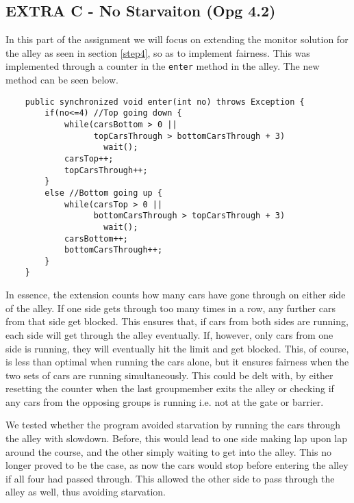 \subsection{EXTRA C - No Starvaiton (Opg 4.2)}
In this part of the assignment we will focus on extending the monitor solution for the alley as seen in section \ref{step4}, so as to implement fairness. This was implemented through a counter in the \texttt{enter} method in the alley. The new method can be seen below.

\begin{lstlisting}
    public synchronized void enter(int no) throws Exception {
        if(no<=4) //Top going down {   
            while(carsBottom > 0 || 
                  topCarsThrough > bottomCarsThrough + 3)
                    wait();
            carsTop++;
            topCarsThrough++;
        }
        else //Bottom going up { 
            while(carsTop > 0 || 
                  bottomCarsThrough > topCarsThrough + 3) 
                    wait();
            carsBottom++;
            bottomCarsThrough++;
        }
    }
\end{lstlisting}

In essence, the extension counts how many cars have gone through on either side of the alley. If one side gets through too many times in a row, any further cars from that side get blocked. This ensures that, if cars from both sides are running, each side will get through the alley eventually. If, however, only cars from one side is running, they will eventually hit the limit and get blocked. This, of course, is less than optimal when running the cars alone, but it ensures fairness when the two sets of cars are running simultaneously. This could be delt with, by either resetting the counter when the last groupmember exits the alley or checking if any cars from the opposing groups is running i.e. not at the gate or barrier.

We tested whether the program avoided starvation by running the cars through the alley with slowdown. Before, this would lead to one side making lap upon lap around the course, and the other simply waiting to get into the alley. This no longer proved to be the case, as now the cars would stop before entering the alley if all four had passed through. This allowed the other side to pass through the alley as well, thus avoiding starvation.